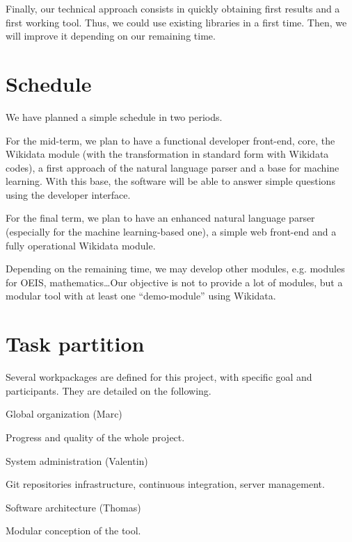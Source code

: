 \documentclass[a4paper,10pt]{article}
\newcounter{wpcounter}
\newenvironment{workpackage}{\stepcounter{wpcounter}\vspace{0.5cm}{\bfseries WP\thewpcounter}}{}
\begin{document}
Finally, our technical approach consists in quickly obtaining first results and 
a first working tool. Thus, we could use existing libraries in a first time. Then, 
we will improve it depending on our remaining time.

\section{Schedule}

We have planned a simple schedule in two periods.

For the mid-term, we plan to have a functional developer front-end, core, the 
Wikidata module (with the transformation in standard form with Wikidata codes), 
a first approach of the natural language parser and a base for machine learning. 
With this base, the software will be able to answer simple questions using the 
developer interface.

For the final term, we plan to have an enhanced natural language parser (especially 
for the machine learning-based one), a simple web front-end and a fully operational 
Wikidata module.

Depending on the remaining time, we may develop other modules, e.g. modules for 
OEIS, mathematics\ldots Our objective is not to provide a lot of modules, but a 
modular tool with at least one ``demo-module'' using Wikidata.

\section{Task partition}

Several workpackages are defined for this project, with specific goal and
participants. They are detailed on the following.

\begin{workpackage}
Global organization (Marc)

Progress and quality of the whole project.
\end{workpackage}

\begin{workpackage}
System administration (Valentin)

Git repositories infrastructure, continuous integration, server management.
\end{workpackage}

\begin{workpackage}
Software architecture (Thomas)

Modular conception of the tool.
\end{workpackage}
\end{document}
